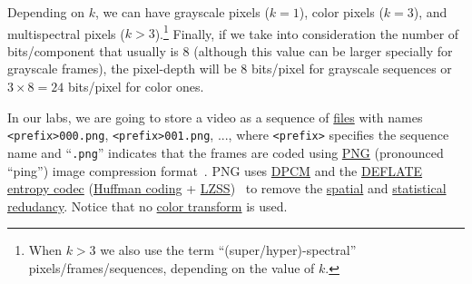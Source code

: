 Depending on $k$, we can have grayscale pixels ($k=1$), color pixels
($k=3$), and multispectral pixels ($k>3$).\footnote{When $k>3$ we also
use the term ``(super/hyper)-spectral'' pixels/frames/sequences, depending
on the value of $k$.} Finally, if we take into consideration the
number of bits/component that usually is $8$ (although this value can be larger
specially for grayscale frames), the pixel-depth will be $8$
bits/pixel for grayscale sequences or $3\times 8=24$ bits/pixel for
color ones.

In our labs, we are going to store a video as a sequence of
\href{https://en.wikipedia.org/wiki/Computer_file}{files} with names
{\tt <prefix>000.png}, {\tt <prefix>001.png}, ..., where {\tt <prefix>} specifies the
sequence name and ``{\tt .png}'' indicates that the frames are coded using
\href{https://en.wikipedia.org/wiki/Portable_Network_Graphics}{PNG}
(pronounced ``ping'') image compression
format~\cite{roelofs1999png,world2003portable}. PNG uses
\href{https://en.wikipedia.org/wiki/Differential_pulse-code_modulation}{DPCM}
and the \href{https://en.wikipedia.org/wiki/DEFLATE}{DEFLATE}
\href{https://en.wikipedia.org/wiki/Entropy_coding}{entropy codec}
(\href{https://en.wikipedia.org/wiki/Huffman_coding}{Huffman coding} +
\href{https://en.wikipedia.org/wiki/Lempel-Ziv-Storer-Szymanski}{LZSS})~\cite{nelson96datacompression}
to remove the
\href{https://en.wikipedia.org/wiki/Image_compression}{spatial} and
\href{https://en.wikipedia.org/wiki/Data_compression}{statistical
  redudancy}. Notice that no
\href{https://en.wikipedia.org/wiki/YUV}{color transform} is
used.


